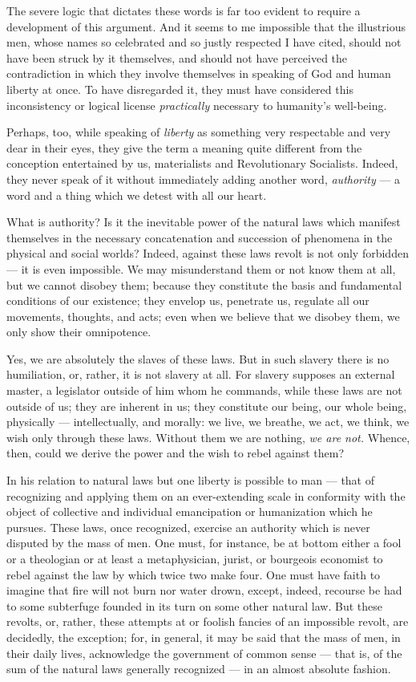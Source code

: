 \documentclass[12pt]{report}
\begin{document}
The severe logic that dictates these words is far too evident to require a development of this argument. And it seems to me impossible that the illustrious men, whose names so celebrated and so justly respected I have cited, should not have been struck by it themselves, and should not have perceived the contradiction in which they involve themselves in speaking of God and human liberty at once. To have disregarded it, they must have considered this inconsistency or logical license \emph{practically} necessary to humanity’s well-being.


Perhaps, too, while speaking of \emph{liberty} as something very respectable and very dear in their eyes, they give the term a meaning quite different from the conception entertained by us, materialists and Revolutionary Socialists. Indeed, they never speak of it without immediately adding another word, \emph{authority} — a word and a thing which we detest with all our heart.


What is authority? Is it the inevitable power of the natural laws which manifest themselves in the necessary concatenation and succession of phenomena in the physical and social worlds? Indeed, against these laws revolt is not only forbidden — it is even impossible. We may misunderstand them or not know them at all, but we cannot disobey them; because they constitute the basis and fundamental conditions of our existence; they envelop us, penetrate us, regulate all our movements, thoughts, and acts; even when we believe that we disobey them, we only show their omnipotence.


Yes, we are absolutely the slaves of these laws. But in such slavery there is no humiliation, or, rather, it is not slavery at all. For slavery supposes an external master, a legislator outside of him whom he commands, while these laws are not outside of us; they are inherent in us; they constitute our being, our whole being, physically — intellectually, and morally: we live, we breathe, we act, we think, we wish only through these laws. Without them we are nothing, \emph{we are not.} Whence, then, could we derive the power and the wish to rebel against them?


In his relation to natural laws but one liberty is possible to man — that of recognizing and applying them on an ever-extending scale in conformity with the object of collective and individual emancipation or humanization which he pursues. These laws, once recognized, exercise an authority which is never disputed by the mass of men. One must, for instance, be at bottom either a fool or a theologian or at least a metaphysician, jurist, or bourgeois economist to rebel against the law by which twice two make four. One must have faith to imagine that fire will not burn nor water drown, except, indeed, recourse be had to some subterfuge founded in its turn on some other natural law. But these revolts, or, rather, these attempts at or foolish fancies of an impossible revolt, are decidedly, the exception; for, in general, it may be said that the mass of men, in their daily lives, acknowledge the government of common sense — that is, of the sum of the natural laws generally recognized — in an almost absolute fashion.
\end{document}
